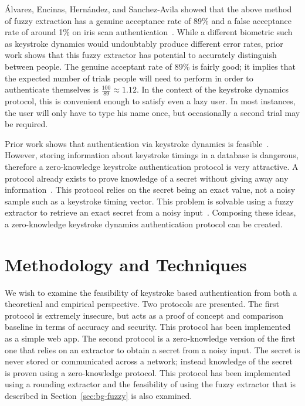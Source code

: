 \documentclass[11pt]{article}
\begin{document}
\'Alvarez, Encinas, Hern\'andez, and Sanchez-Avila showed that the above method of fuzzy extraction has a genuine acceptance rate of 89\% and a false acceptance rate of around 1\% on iris scan authentication~\cite{conf/csreaSAM/AlvarezEA09}. While a different biometric such as keystroke dynamics would undoubtably produce different error rates, prior work shows that this fuzzy extractor has potential to accurately distinguish between people. The genuine acceptant rate of 89\% is fairly good; it implies that the expected number of trials people will need to perform in order to authenticate themselves is $\frac{100}{89}\approx 1.12$. In the context of the keystroke dynamics protocol, this is convenient enough to satisfy even a lazy user. In most instances, the user will only have to type his name once, but occasionally a second trial may be required.

Prior work shows that authentication via keystroke dynamics is feasible~\cite{monrose:authentication}. However, storing information about keystroke timings in a database is dangerous, therefore a zero-knowledge keystroke authentication protocol is very attractive. A protocol already exists to prove knowledge of a secret without giving away any information~\cite{crypto-1986-1125}. This protocol relies on the secret being an exact value, not a noisy sample such as a keystroke timing vector. This problem is solvable using a fuzzy extractor to retrieve an exact secret from a noisy input~\cite{conf/csreaSAM/AlvarezEA09}. Composing these ideas, a zero-knowledge keystroke dynamics authentication protocol can be created.

\section{Methodology and Techniques}
\label{sec:methods}

We wish to examine the feasibility of keystroke based authentication from both a theoretical and empirical perspective. Two protocols are presented. The first protocol is extremely insecure, but acts as a proof of concept and comparison baseline in terms of accuracy and security. This protocol has been implemented as a simple web app. The second protocol is a zero-knowledge version of the first one that relies on an extractor to obtain a secret from a noisy input. The secret is never stored or communicated across a network; instead knowledge of the secret is proven using a zero-knowledge protocol. This protocol has been implemented using a rounding extractor and the feasibility of using the fuzzy extractor that is described in Section~\ref{sec:bg-fuzzy} is also examined.
\end{document}
